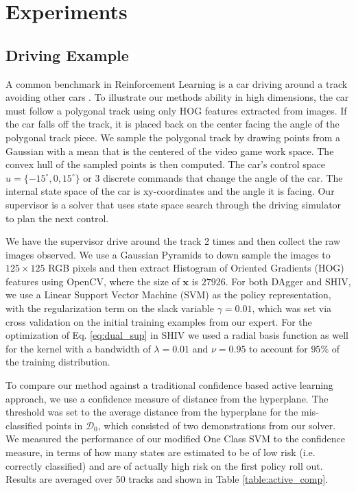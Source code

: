 \documentclass[10pt, conference]{ieeeconf}      %
\newcommand{\bx}{\mathbf{x}}
\begin{document}
\section{Experiments}
\subsection{Driving Example}
A common benchmark in Reinforcement Learning  is a car driving around a track avoiding other cars \cite{argall2009survey}. To illustrate our methods ability in high dimensions, the car must follow a polygonal track using only HOG features extracted from images. If the car falls off the track, it is placed back on the center facing the angle of the polygonal track piece. We sample the polygonal track by drawing points from a Gaussian with a mean that is the centered of the video game work space. The convex hull of the sampled points is then computed. The car's control space $u = \lbrace -15^\circ, 0, 15^\circ \rbrace$ or 3 discrete commands that change the angle of the car. The internal state space of the car is xy-coordinates and the angle it is facing. Our supervisor is a solver that uses state space search through the driving simulator to plan the next control.

We have the supervisor drive around the track 2 times and then collect the raw images observed. We use a Gaussian Pyramids to down sample the images to $125 \times 125$ RGB pixels and then extract Histogram of Oriented Gradients (HOG) features using OpenCV,  where the size of $\bx$ is $27926$. For both DAgger and SHIV, we use a Linear Support Vector Machine (SVM) as the policy representation, with the regularization term on the slack variable $\gamma=0.01$, which was set via cross validation on the initial training examples from our expert. For the optimization of Eq. \ref{eq:dual_sup} in SHIV we used a radial basis function as well for the kernel with a bandwidth of $\lambda=0.01$ and $\nu = 0.95$ to account for $95\%$ of the training distribution. 

To compare our method against a traditional confidence based active learning approach, we use a confidence measure  of distance from the hyperplane. The threshold was set to the average distance from the hyperplane for the mis-classified points in $\mathcal{D}_0$, which consisted of two demonstrations from our solver. We measured the performance of our modified One Class SVM to the confidence measure, in terms of how many states are estimated to be of low risk (i.e. correctly classified) and are of actually high risk on the first policy roll out. Results  are averaged over 50 tracks and shown in Table \ref{table:active_comp}. 
\end{document}
